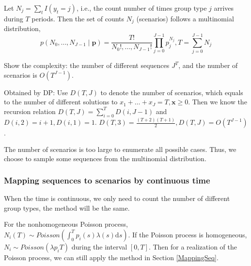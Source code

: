 Let $N_{j} = \sum_{t} I(y_t = j)$, i.e., the count number of times group type $j$ arrives during $T$ periods. Then the set of counts $N_{j}$ (scenarios) follows a multinomial distribution, $$p\left(N_0, \ldots, N_{J-1} \mid \mathbf{p}\right)=\frac{T !}{N_{0}!, \ldots, N_{J-1}!} \prod_{j=0}^{J-1} p_{j}^{N_j}, T = \sum_{j=0}^{J-1} N_{j}$$



Show the complexity: the number of different sequences $J^{T}$, and the number of scenarios is $O(T^{J-1})$.

Obtained by DP:
Use $D(T,J) $ to denote the number of scenarios, which equals to the number of different solutions to $x_{1}+\ldots + x_{J} = T, \mathbf{x} \geq 0$.
Then we know the recursion relation $D(T, J) = \sum_{i= 0}^{T} D(i, J-1)$ and $D(i,2) = i+1, D(i,1) = 1$.
$D(T,3) = \frac{(T+2)(T+1)}{2}, D(T,J) = O(T^{J-1})$.

The number of scenarios is too large to enumerate all possible cases.
Thus, we choose to sample some sequences from the multinomial distribution.



\subsubsection{Mapping sequences to scenarios by continuous time}

When the time is continuous, we only need to count the number of different group types, the method will be the same.

For the nonhomogeneous Poisson process, $N_{i}(T) \sim Poisson (\int_0^{T} p_i(s)\lambda(s) \mathrm{d} s)$. If the Poisson process is homogeneous, $N_{i} \sim Poisson(\lambda p_i T)$ during the interval $[0, T]$. Then for a realization of the Poisson process, we can still apply the method in Section \ref{MappingSeq}.

